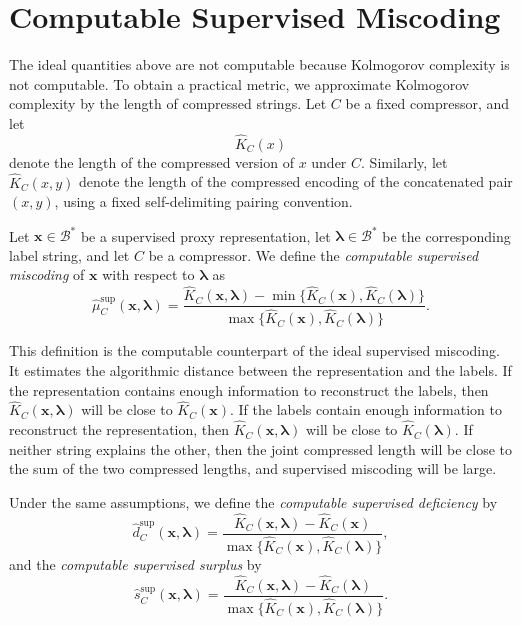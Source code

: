 \section{Computable Supervised Miscoding}
\label{sec:computable_supervised_miscoding}

The ideal quantities above are not computable because Kolmogorov complexity is not computable. To obtain a practical metric, we approximate Kolmogorov complexity by the length of compressed strings. Let \(C\) be a fixed compressor, and let
\[
    \hat K_C(x)
\]
denote the length of the compressed version of \(x\) under \(C\). Similarly, let \(\hat K_C(x,y)\) denote the length of the compressed encoding of the concatenated pair \((x,y)\), using a fixed self-delimiting pairing convention.

\begin{definition}
\label{def:computable_supervised_miscoding}
Let \(\mathbf{x}\in\mathcal B^\ast\) be a supervised proxy representation, let \(\boldsymbol{\lambda}\in\mathcal B^\ast\) be the corresponding label string, and let \(C\) be a compressor. We define the \emph{computable supervised miscoding} of \(\mathbf{x}\) with respect to \(\boldsymbol{\lambda}\) as
\[
    \hat\mu_C^{\mathrm{sup}}(\mathbf{x},\boldsymbol{\lambda})
    =
    \frac{
        \hat K_C(\mathbf{x},\boldsymbol{\lambda})
        -
        \min\{\hat K_C(\mathbf{x}),\hat K_C(\boldsymbol{\lambda})\}
    }
    {
        \max\{\hat K_C(\mathbf{x}),\hat K_C(\boldsymbol{\lambda})\}
    }.
\]
\end{definition}

This definition is the computable counterpart of the ideal supervised miscoding. It estimates the algorithmic distance between the representation and the labels. If the representation contains enough information to reconstruct the labels, then \(\hat K_C(\mathbf{x},\boldsymbol{\lambda})\) will be close to \(\hat K_C(\mathbf{x})\). If the labels contain enough information to reconstruct the representation, then \(\hat K_C(\mathbf{x},\boldsymbol{\lambda})\) will be close to \(\hat K_C(\boldsymbol{\lambda})\). If neither string explains the other, then the joint compressed length will be close to the sum of the two compressed lengths, and supervised miscoding will be large.

\begin{definition}
\label{def:computable_supervised_deficiency_surplus}
Under the same assumptions, we define the \emph{computable supervised deficiency} by
\[
    \hat d_C^{\mathrm{sup}}(\mathbf{x},\boldsymbol{\lambda})
    =
    \frac{
        \hat K_C(\mathbf{x},\boldsymbol{\lambda})
        -
        \hat K_C(\mathbf{x})
    }
    {
        \max\{\hat K_C(\mathbf{x}),\hat K_C(\boldsymbol{\lambda})\}
    },
\]
and the \emph{computable supervised surplus} by
\[
    \hat s_C^{\mathrm{sup}}(\mathbf{x},\boldsymbol{\lambda})
    =
    \frac{
        \hat K_C(\mathbf{x},\boldsymbol{\lambda})
        -
        \hat K_C(\boldsymbol{\lambda})
    }
    {
        \max\{\hat K_C(\mathbf{x}),\hat K_C(\boldsymbol{\lambda})\}
    }.
\]
\end{definition}

